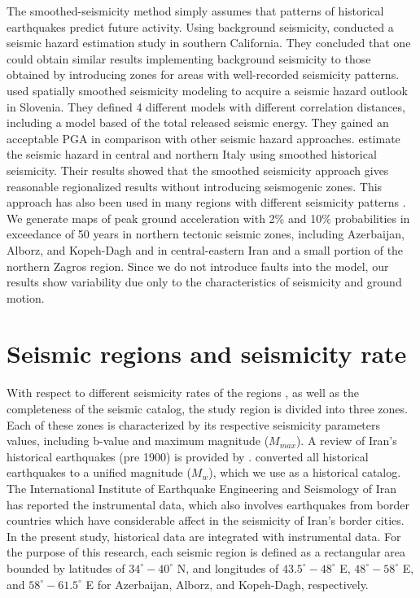 \documentclass{article}
\begin{document}
The smoothed-seismicity method simply assumes that patterns of historical earthquakes predict future activity. Using background seismicity, \citet{Cao1996} conducted a seismic hazard estimation study in southern California. They concluded that one could obtain similar results implementing background seismicity to those obtained by introducing zones for areas with well-recorded seismicity patterns. \citet{Lapajne1997} used spatially smoothed seismicity modeling to acquire a seismic hazard outlook in Slovenia. They defined 4 different models with different correlation distances, including a model based of the total released seismic energy. They gained an acceptable PGA in comparison with other seismic hazard approaches. \citet{Akinci2004} estimate the seismic hazard in central and northern Italy using smoothed historical seismicity. Their results showed that the smoothed seismicity approach gives reasonable regionalized results without introducing seismogenic zones. This approach has also been used in many regions with different seismicity patterns \citep{Wesson1999, Klein2001, Hamdache2008, Kalkan2009, Moschetti2014, Boyd2008}. We generate maps of peak ground acceleration with 2\% and 10\% probabilities in exceedance of 50 years in northern tectonic seismic zones, including Azerbaijan, Alborz, and Kopeh-Dagh and in central-eastern Iran and a small portion of the northern Zagros region. Since we do not introduce faults into the model, our results show variability due only to the characteristics of seismicity and ground motion. 

\section{Seismic regions and seismicity rate}
With respect to different seismicity rates of the regions \cite{Nemati2015}, as well as the completeness of the seismic catalog, the study region is divided into three zones. Each of these zones is characterized by its respective seismicity parameters values, including b-value and maximum magnitude ($M{_{max}}$). A review of Iran's historical earthquakes (pre 1900) is provided by \citet{Ambraseys2005}. \citet{Karimiparidari2013} converted all historical earthquakes to a unified magnitude ($M_w$), which we use as a historical catalog. The International Institute of Earthquake Engineering and Seismology of Iran \citep{IIEES} has reported the instrumental data, which also involves earthquakes from border countries which have considerable affect in the seismicity of Iran's border cities. 
In the present study, historical data are integrated with instrumental data. For the purpose of this research, each seismic region is defined as a rectangular area bounded by latitudes of $34^{\circ}-40^{\circ}$ N, and longitudes of $43.5^{\circ}-48^{\circ}$ E, $48^{\circ}-58^{\circ}$ E, and $58^{\circ}-61.5^{\circ}$ E for Azerbaijan, Alborz, and Kopeh-Dagh, respectively. 
\end{document}
